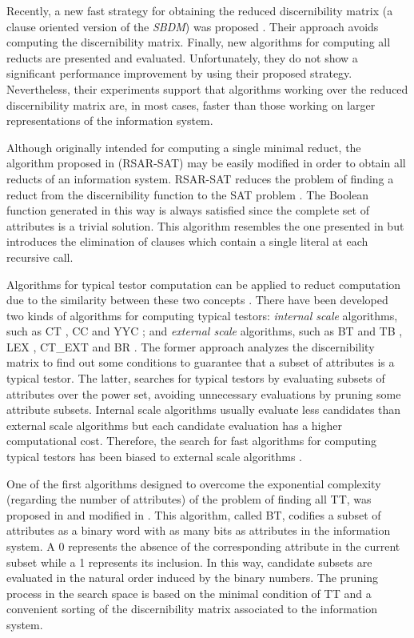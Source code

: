 \documentclass[number,preprint,review,12pt]{elsarticle}
\begin{document}
  Recently, a new fast strategy for obtaining the reduced discernibility matrix (a clause oriented version of the \textit{SBDM}) was  proposed \cite{Chen2012}. Their approach avoids computing the discernibility matrix. Finally, new algorithms for computing all reducts are presented and evaluated. Unfortunately, they do not show a significant performance improvement by using their proposed strategy. Nevertheless, their experiments support that algorithms working over the reduced discernibility matrix are, in most cases, faster than those working on larger representations of the information system.
  
  Although originally intended for computing a single minimal reduct, the algorithm proposed in \citep{Jensen14} (RSAR-SAT) may be easily modified in order to obtain all reducts of an information system. RSAR-SAT reduces the problem of finding a reduct from the discernibility function to the SAT problem \citep{Davis62}. The Boolean function generated in this way is always satisfied since the complete set of attributes is a trivial solution. This algorithm resembles the one presented in \citep{Starzyk99} but introduces the elimination of clauses which contain a single literal at each recursive call. 

  Algorithms for typical testor computation can be applied to reduct computation due to the similarity between these two concepts \citep{Lazo15}. There have been developed two kinds of algorithms for computing typical testors: \emph{internal scale} algorithms, such as CT \citep{Bravo83}, CC \citep{Aguila84} and YYC \citep{Alba14}; and \emph{external scale} algorithms, such as BT and TB \citep{Ruiz85}, LEX \citep{Santiesteban03}, CT\_EXT \citep{Sanchez07} and BR \citep{Lias09}. The former approach analyzes the discernibility matrix to find out some conditions to guarantee that a subset of attributes is a typical testor. The latter, searches for typical testors by evaluating subsets of attributes over the power set, avoiding unnecessary evaluations by pruning some attribute subsets. Internal scale algorithms usually evaluate less candidates than external scale algorithms but each candidate evaluation has a higher computational cost. Therefore, the search for fast algorithms for computing typical testors has been biased to external scale algorithms \citep{Alba14}.
  
  One of the first algorithms designed to overcome the exponential complexity (regarding the number of attributes) of the problem of finding all TT, was proposed in \cite{Ruiz85} and modified in \cite{sanchez02}. This algorithm, called BT, codifies a subset of attributes as a binary word with as many bits as attributes in the information system. A 0 represents the absence of the corresponding attribute in the current subset while a 1 represents its inclusion. In this way, candidate subsets are evaluated in the natural order induced by the binary numbers. The pruning process in the search space is based on the minimal condition of TT and a convenient sorting of the discernibility matrix associated to the information system. 
  
\end{document}
